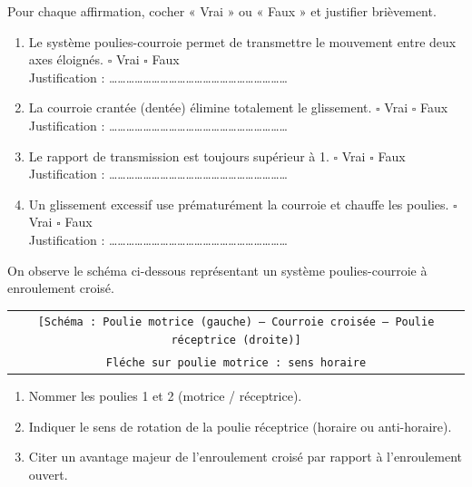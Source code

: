 \documentclass[11pt]{article}
\begin{document}
\begin{exercice}
Pour chaque affirmation, cocher « Vrai » ou « Faux » et justifier brièvement.
\begin{enumerate}
    \item Le système poulies-courroie permet de transmettre le mouvement entre deux axes éloignés. \hfill $\square$ Vrai \quad $\square$ Faux \\
    Justification : \ldots\ldots\ldots\ldots\ldots\ldots\ldots\ldots\ldots\ldots\ldots\ldots\ldots\ldots\ldots\ldots\ldots\ldots\ldots\ldots\ldots
    \item La courroie crantée (dentée) élimine totalement le glissement. \hfill $\square$ Vrai \quad $\square$ Faux \\
    Justification : \ldots\ldots\ldots\ldots\ldots\ldots\ldots\ldots\ldots\ldots\ldots\ldots\ldots\ldots\ldots\ldots\ldots\ldots\ldots\ldots\ldots
    \item Le rapport de transmission est toujours supérieur à 1. \hfill $\square$ Vrai \quad $\square$ Faux \\
    Justification : \ldots\ldots\ldots\ldots\ldots\ldots\ldots\ldots\ldots\ldots\ldots\ldots\ldots\ldots\ldots\ldots\ldots\ldots\ldots\ldots\ldots
    \item Un glissement excessif use prématurément la courroie et chauffe les poulies. \hfill $\square$ Vrai \quad $\square$ Faux \\
    Justification : \ldots\ldots\ldots\ldots\ldots\ldots\ldots\ldots\ldots\ldots\ldots\ldots\ldots\ldots\ldots\ldots\ldots\ldots\ldots\ldots\ldots
\end{enumerate}
\end{exercice}

\begin{exercice}
On observe le schéma ci-dessous représentant un système poulies-courroie à enroulement croisé.
\begin{center}
\begin{tabular}{c}
\texttt{[Schéma : Poulie motrice (gauche) -- Courroie croisée -- Poulie réceptrice (droite)]} \\
\texttt{Fléche sur poulie motrice : sens horaire}
\end{tabular}
\end{center}
\begin{enumerate}
    \item Nommer les poulies 1 et 2 (motrice / réceptrice).
    \item Indiquer le sens de rotation de la poulie réceptrice (horaire ou anti-horaire).
    \item Citer un avantage majeur de l'enroulement croisé par rapport à l'enroulement ouvert.
\end{enumerate}
\end{exercice}
\end{document}
